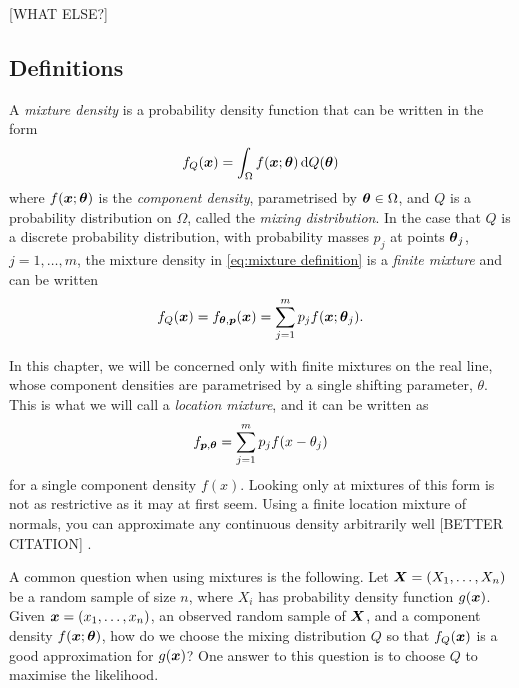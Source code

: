 	[WHAT ELSE?]

	\subsection{Definitions}
	A \emph{mixture density} is a probability density function that can be written in the form
	\begin{equation}
		f_Q({\bm{{x}}}) = \int_\Omega f({\bm{{x}}}; {\bm{{\theta}}}) \, \mathrm{d} Q({\bm{{\theta}}})
		\label{eq:mixture definition}
	\end{equation}
	where $f({\bm{{x}}};{\bm{{\theta}}})$ is the \emph{component density}, parametrised by ${\bm{{\theta}}} \in \Omega$, and $Q$ is a probability distribution on $\Omega$, called the \emph{mixing distribution}. In the case that $Q$ is a discrete probability distribution, with probability masses $p_j$ at points ${\bm{{\theta}}}_j$, $j = 1, \dots, m$, the mixture density in \eqref{eq:mixture definition} is a \emph{finite mixture} and can be written
	\begin{equation}
		f_Q({\bm{{x}}}) = f_{{\bm{{\theta}}}, {\bm{{p}}}}({\bm{{x}}}) = \sum_{j = 1}^m p_j f({\bm{{x}}}; {\bm{{\theta}}}_j).
	\end{equation}

	In this chapter, we will be concerned only with finite mixtures on the real line, whose component densities are parametrised by a single shifting parameter, $\theta$. This is what we will call a \emph{location mixture}, and it can be written as
	\begin{equation}
		f_{{\bm{{p}}}, {\bm{{\theta}}}} = \sum_{j = 1}^m p_j f(x - \theta_j)
		\label{eq:mixturesum}
	\end{equation}
	for a single component density $f(x)$.
	Looking only at mixtures of this form is not as restrictive as it may at first seem. Using a finite location mixture of normals, you can approximate any continuous density arbitrarily well [BETTER CITATION] \cite{McLachlan2004-ik}.

	A common question when using mixtures is the following. Let ${\bm{{X}}} = (X_1, \dots, X_n)$ be a random sample of size $n$, where $X_i$ has probability density function $g({\bm{{x}}})$. Given ${\bm{{x}}} = (x_1, \dots, x_n)$, an observed random sample of ${\bm{{X}}}$, and a component density $f({\bm{{x}}}; {\bm{{\theta}}})$, how do we choose the mixing distribution $Q$ so that $f_Q({\bm{{x}}})$ is a good approximation for $g({\bm{{x}}})$?	One answer to this question is to choose $Q$ to maximise the likelihood.

